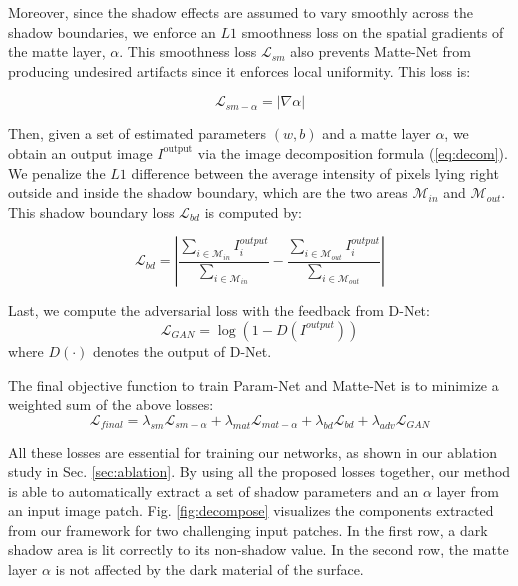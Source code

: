 \documentclass[runningheads]{llncs}
\def\mM{\mathcal{M}}
\begin{document}
Moreover, since the shadow effects are assumed to vary smoothly across the shadow boundaries, we enforce an $L1$ smoothness loss on the spatial gradients of the matte layer, $\alpha$. This smoothness loss $\mathcal{L}_{sm} $ also prevents Matte-Net from producing undesired artifacts since it enforces local uniformity. This loss is:

\begin{equation}
\mathcal{L}_{sm-\alpha} =|\nabla{\alpha}| 
\end{equation}

Then, given a set of estimated parameters $(w,b)$ and a matte layer $\alpha$, we obtain an output image $I^{\textrm{output}}$ via the image decomposition formula (\ref{eq:decom}). We penalize the $L1$ difference between the average intensity of pixels lying right outside and inside the shadow boundary, which are the two areas $\mM_{in}$ and $\mM_{out}$. This shadow boundary loss $\mathcal{L}_{bd}$ is computed by:

\begin{equation}
\mathcal{L}_{bd} = \left|  \frac{\sum_{i\in \mM_{in}} I_i^{output}}{\sum_{i\in \mM_{in}} }  -  \frac{\sum_{i\in \mM_{out}}  I_i^{output}}{\sum_{i\in \mM_{out}}}\right|
\end{equation}

Last, we compute the adversarial loss with the feedback from D-Net: 
\begin{equation}
\mathcal{L}_{GAN} =\log (1-D(I^{output})) 
\end{equation}
where $D(\cdot)$ denotes the output of D-Net.

The final objective function to train Param-Net and Matte-Net is to minimize a weighted sum of the above losses:
\begin{equation}
\mathcal{L}_{final} = \lambda_{sm}\mathcal{L}_{sm-\alpha} + \lambda_{mat}\mathcal{L}_{mat-\alpha} + \lambda_{bd}\mathcal{L}_{bd}+ \lambda_{adv}\mathcal{L}_{GAN}
\end{equation}

All these losses are essential for training our networks, as shown in our ablation study in Sec. \ref{sec:ablation}. By using all the proposed losses together, our method is able to automatically extract a set of shadow parameters and an $\alpha$ layer from an input image patch. 
Fig. \ref{fig:decompose} visualizes the components extracted from our framework for two challenging input patches. In the first row, a dark shadow area is lit correctly to its non-shadow value. In the second row, the matte layer $\alpha$ is not affected by the dark material of the surface.
\end{document}
